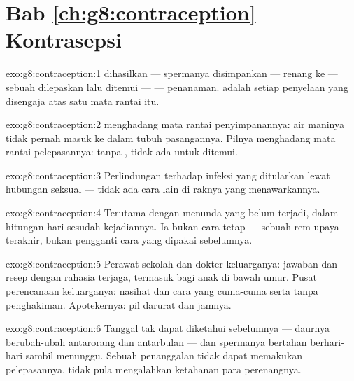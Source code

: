 \section*{Bab \ref{ch:g8:contraception} --- Kontrasepsi}

\begin{solution}{exo:g8:contraception:1}
 dihasilkan --- spermanya disimpankan --- renang ke
 --- sebuah  dilepaskan lalu
ditemui ---  --- penanaman.  adalah
setiap penyelaan yang disengaja atas satu mata rantai itu.
\end{solution}

\begin{solution}{exo:g8:contraception:2}
 menghadang mata rantai penyimpanannya: air maninya
tidak pernah masuk ke dalam tubuh pasangannya. Pilnya
menghadang mata rantai pelepasannya: tanpa , tidak
ada  untuk ditemui.
\end{solution}

\begin{solution}{exo:g8:contraception:3}
Perlindungan terhadap infeksi yang ditularkan lewat hubungan
seksual --- tidak ada cara lain di raknya yang
menawarkannya.
\end{solution}

\begin{solution}{exo:g8:contraception:4}
Terutama dengan menunda  yang belum terjadi, dalam
hitungan hari sesudah kejadiannya. Ia bukan cara tetap ---
sebuah rem upaya terakhir, bukan pengganti cara yang dipakai
sebelumnya.
\end{solution}

\begin{solution}{exo:g8:contraception:5}
Perawat sekolah dan dokter keluarganya: jawaban dan resep
dengan rahasia terjaga, termasuk bagi anak di bawah umur.
Pusat perencanaan keluarganya: nasihat dan cara yang
cuma-cuma serta tanpa penghakiman. Apotekernya: pil darurat
dan jamnya.
\end{solution}

\begin{solution}{exo:g8:contraception:6}
Tanggal  tak dapat diketahui sebelumnya ---
daurnya berubah-ubah antarorang dan antarbulan --- dan
spermanya bertahan berhari-hari sambil menunggu. Sebuah
penanggalan tidak dapat memakukan pelepasannya, tidak pula
mengalahkan ketahanan para perenangnya.
\end{solution}

